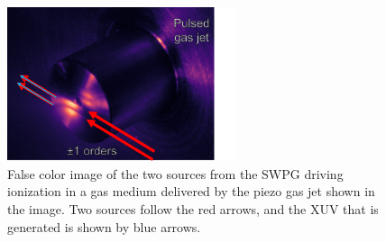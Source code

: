 \begin{figure}
	\centering
	\includegraphics[width=0.6\textwidth]{figures/Two_source/pulse_jet_ts.png}
	\caption[Image of plasma generated by two sources in a gas medium delivered by a piezoelectric pulsed gas jet]{False color image of the two sources from the SWPG driving ionization in a gas medium delivered by the piezo gas jet shown in the image.  Two sources follow the red arrows, and the XUV that is generated is shown by blue arrows.}
	\label{fig:piezo_jet}
\end{figure}

